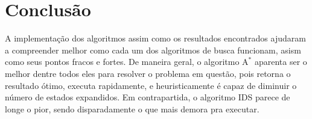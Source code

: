 \documentclass{article}
\begin{document}
\section{Conclusão}

A implementação dos algoritmos assim como os resultados encontrados ajudaram a compreender melhor como cada um dos algoritmos de busca funcionam,
asism como seus pontos fracos e fortes. De maneira geral, o algoritmo \(\text{A}^*\) aparenta ser o melhor dentre todos eles para resolver o problema em questão, pois retorna o resultado ótimo, executa rapidamente,
e heuristicamente é capaz de diminuir o número de estados expandidos. Em contrapartida, o algoritmo IDS parece de longe o pior, sendo disparadamente o que mais demora pra executar.
\end{document}
